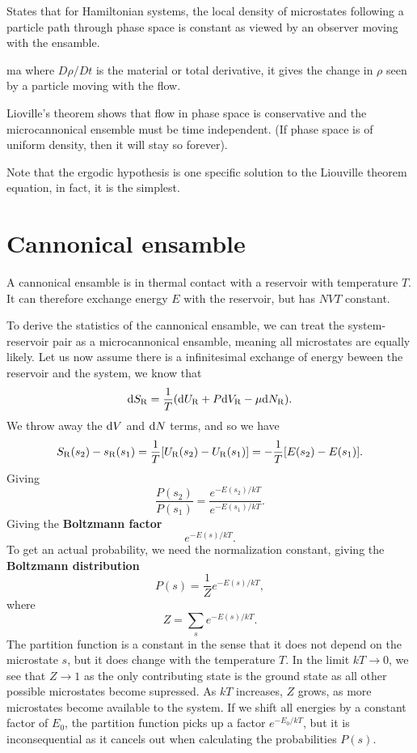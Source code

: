 \documentclass[a4paper, 11pt, notitlepage, english]{article}
\renewcommand{\d}{{\rm d}}
\begin{document}
States that for Hamiltonian systems, the local density of microstates following a particle path through phase space is constant as viewed by an observer moving with the ensamble. 

ma
where $D\rho/Dt$ is the material or total derivative, it gives the change in $\rho$ seen by a particle moving with the flow. 

Lioville's theorem shows that flow in phase space is conservative and the microcannonical ensemble must be time independent. (If phase space is of uniform density, then it will stay so forever).

Note that the ergodic hypothesis is one specific solution to the Liouville theorem equation, in fact, it is the simplest.

\section*{Cannonical ensamble}

A cannonical ensamble is in thermal contact with a reservoir with temperature $T$. It can therefore exchange energy $E$ with the reservoir, but has $NVT$ constant. 

To derive the statistics of the cannonical ensamble, we can treat the system-reservoir pair as a microcannonical ensamble, meaning all microstates are equally likely. Let us now assume there is a infinitesimal exchange of energy beween the reservoir and the system, we know that
$$\d S_{\rm R} = \frac{1}{T}(\d U_{\rm R} + P \d V_{\rm R} - \mu \d N_{\rm R}).$$
We throw away the $\d V$ and $\d N$ terms, and so we have
$$S_{\rm R}(s_2) - s_{\rm R}(s_1) = \frac{1}{T}[U_{\rm R}(s_2) - U_{\rm R}(s_1)] = -\frac{1}{T}[E(s_2) - E(s_1)].$$
Giving
$$\frac{P(s_2)}{P(s_1)} = \frac{e^{-E(s_2)/kT}}{e^{-E(s_1)/kT}}.$$
Giving the \textbf{Boltzmann factor}
$$e ^{-E(s)/kT}.$$
To get an actual probability, we need the normalization constant, giving the \textbf{Boltzmann distribution}
$$P(s) = \frac{1}{Z}e^{-E(s)/kT},$$
where 
$$Z = \sum_s e^{-E(s)/kT}.$$
The partition function is a constant in the sense that it does not depend on the microstate $s$, but it does change with the temperature $T$. In the limit $kT \to 0$, we see that $Z \to 1$ as the only contributing state is the ground state as all other possible microstates become supressed. As $kT$ increases, $Z$ grows, as more microstates become available to the system. If we shift all energies by a constant factor of $E_0$, the partition function picks up a factor $e^{-E_0/kT}$, but it is inconsequential as it cancels out when calculating the probabilities $P(s)$.
\end{document}

